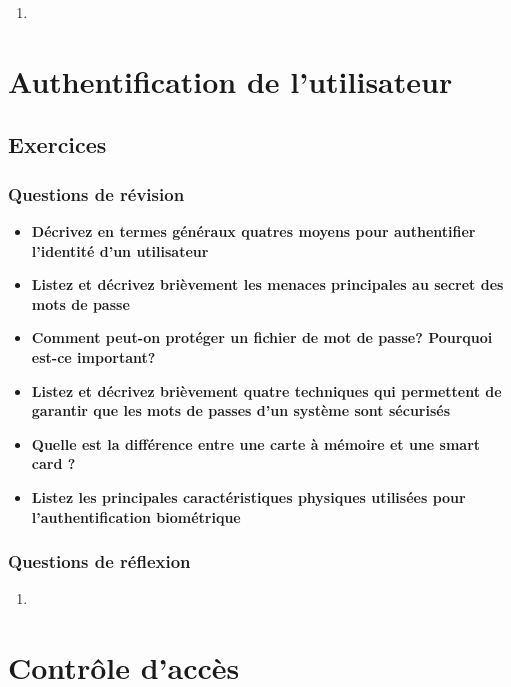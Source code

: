 \documentclass{report}
\begin{document}
			\begin{enumerate}
				\item
			\end{enumerate}

\chapter{Authentification de l'utilisateur}
	
	\section{Exercices}

		\subsection{Questions de révision}

			\begin{itemize}
				\item \textbf{Décrivez en termes généraux quatres moyens pour authentifier l'identité d'un utilisateur}
				\item \textbf{Listez et décrivez brièvement les menaces principales au secret des mots de passe}
				\item \textbf{Comment peut-on protéger un fichier de mot de passe? Pourquoi est-ce important?}
				\item \textbf{Listez et décrivez brièvement quatre techniques qui permettent de garantir que les mots de passes d'un système sont sécurisés}
				\item \textbf{Quelle est la différence entre une carte à mémoire et une smart card ?}
				\item \textbf{Listez les principales caractéristiques physiques utilisées pour l'authentification biométrique}
			\end{itemize}
				

		\subsection{Questions de réflexion}

			\begin{enumerate}
				\item 
			\end{enumerate}

\chapter{Contrôle d'accès}
	
\end{document}
